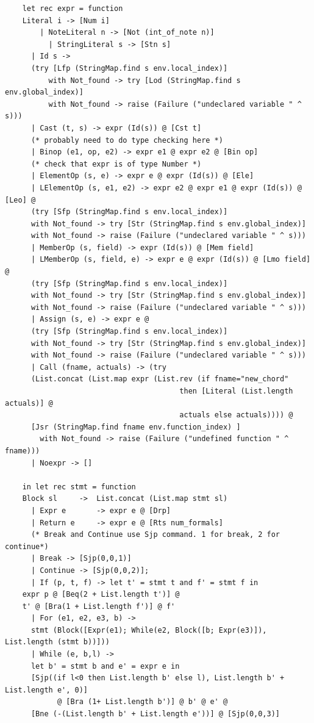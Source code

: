 \documentclass[12pt,A4]{book}
\begin{document}
\begin{verbatim}
    let rec expr = function
	Literal i -> [Num i]
	    | NoteLiteral n -> [Not (int_of_note n)]
		  | StringLiteral s -> [Stn s]
      | Id s ->
	  (try [Lfp (StringMap.find s env.local_index)]
          with Not_found -> try [Lod (StringMap.find s env.global_index)]
          with Not_found -> raise (Failure ("undeclared variable " ^ s)))
      | Cast (t, s) -> expr (Id(s)) @ [Cst t]
      (* probably need to do type checking here *)
      | Binop (e1, op, e2) -> expr e1 @ expr e2 @ [Bin op]
      (* check that expr is of type Number *)
      | ElementOp (s, e) -> expr e @ expr (Id(s)) @ [Ele]
      | LElementOp (s, e1, e2) -> expr e2 @ expr e1 @ expr (Id(s)) @ [Leo] @
	  (try [Sfp (StringMap.find s env.local_index)]
  	  with Not_found -> try [Str (StringMap.find s env.global_index)]
	  with Not_found -> raise (Failure ("undeclared variable " ^ s)))
      | MemberOp (s, field) -> expr (Id(s)) @ [Mem field]
      | LMemberOp (s, field, e) -> expr e @ expr (Id(s)) @ [Lmo field] @
	  (try [Sfp (StringMap.find s env.local_index)]
  	  with Not_found -> try [Str (StringMap.find s env.global_index)]
	  with Not_found -> raise (Failure ("undeclared variable " ^ s)))
      | Assign (s, e) -> expr e @
	  (try [Sfp (StringMap.find s env.local_index)]
  	  with Not_found -> try [Str (StringMap.find s env.global_index)]
	  with Not_found -> raise (Failure ("undeclared variable " ^ s)))
      | Call (fname, actuals) -> (try
	  (List.concat (List.map expr (List.rev (if fname="new_chord" 
                                        then [Literal (List.length actuals)] @ 
                                        actuals else actuals)))) @
	  [Jsr (StringMap.find fname env.function_index) ]
        with Not_found -> raise (Failure ("undefined function " ^ fname)))
      | Noexpr -> []

    in let rec stmt = function
	Block sl     ->  List.concat (List.map stmt sl)
      | Expr e       -> expr e @ [Drp]
      | Return e     -> expr e @ [Rts num_formals]
      (* Break and Continue use Sjp command. 1 for break, 2 for continue*)
      | Break -> [Sjp(0,0,1)]
      | Continue -> [Sjp(0,0,2)];
      | If (p, t, f) -> let t' = stmt t and f' = stmt f in
	expr p @ [Beq(2 + List.length t')] @
	t' @ [Bra(1 + List.length f')] @ f'
      | For (e1, e2, e3, b) ->
	  stmt (Block([Expr(e1); While(e2, Block([b; Expr(e3)]), List.length (stmt b))]))
      | While (e, b,l) -> 
	  let b' = stmt b and e' = expr e in
	  [Sjp((if l<0 then List.length b' else l), List.length b' + List.length e', 0)] 
            @ [Bra (1+ List.length b')] @ b' @ e' @
	  [Bne (-(List.length b' + List.length e'))] @ [Sjp(0,0,3)]


\end{verbatim}
\end{document}
